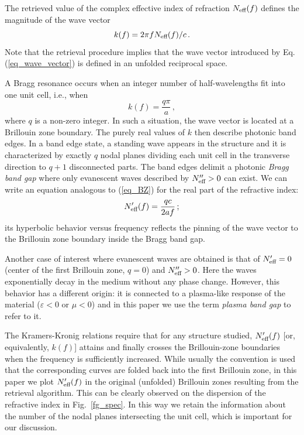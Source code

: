 The retrieved value of the complex effective index of refraction $N_{\text{eff} }(f)$ defines the magnitude of the wave vector
\begin{equation}\label{eq_wave_vector} k(f) = 2\pi f N_{\text{eff} }(f) /c\,.  \end{equation}
Note that the retrieval procedure  implies that the wave vector introduced by Eq. (\ref{eq_wave_vector}) is defined in an unfolded reciprocal space. 

A Bragg resonance occurs when an integer number of half-wavelengths fit into one unit cell, i.e.,  when
\begin{equation}\label{eq_BZ} k(f) = \frac{q \pi}{a}\,, \end{equation}
where $q$ is a non-zero integer. In such a situation, the wave vector is located at a Brillouin zone boundary. The purely real values of $k$ then describe photonic band edges.  In a band edge state, a standing wave appears in the structure and it is characterized by exactly $q$ nodal planes dividing each unit cell in the transverse direction to $q+1$ disconnected parts. The band edges delimit a photonic {\itshape Bragg band gap} where only evanescent waves described by $N_{\text{eff} }''>0$ can exist.  We can write an equation analogous to (\ref{eq_BZ}) for the real part of the refractive index:
\begin{equation}\label{eq_BZN} N_{\text{eff} }'(f) = \frac{q c}{2 a f}\,; \end{equation}
its hyperbolic behavior versus frequency reflects the pinning of the wave vector to the Brillouin zone boundary inside the Bragg band gap.

Another case of interest where evanescent waves are obtained is that of $N_{\text{eff} }' = 0$ (center of the first Brillouin zone, $q=0$) and $N_{\text{eff} }''>0$. Here the waves exponentially decay in the medium without any phase change. However, this behavior has a different origin: it is connected to a plasma-like response of the material ($\varepsilon<0$ or $\mu<0$) and in this paper we use the term \textit{plasma band gap} to refer to it.

The Kramers-Kronig relations require that for any structure studied, $N_{\text{eff} }'(f)$ [or, equivalently, $k(f)$] attains and finally crosses the Brillouin-zone boundaries when the frequency is sufficiently increased. While usually the convention is used that the corresponding curves are folded back into the first Brillouin zone, in this paper we plot $N_{\text{eff} }'(f)$ in the original (unfolded) Brillouin zones resulting from the retrieval algorithm. This can be clearly observed on the dispersion of the refractive index in Fig.\ \ref{fg_spec}. In this way we retain the information about the number of the nodal planes intersecting the unit cell, which is important for our discussion.

